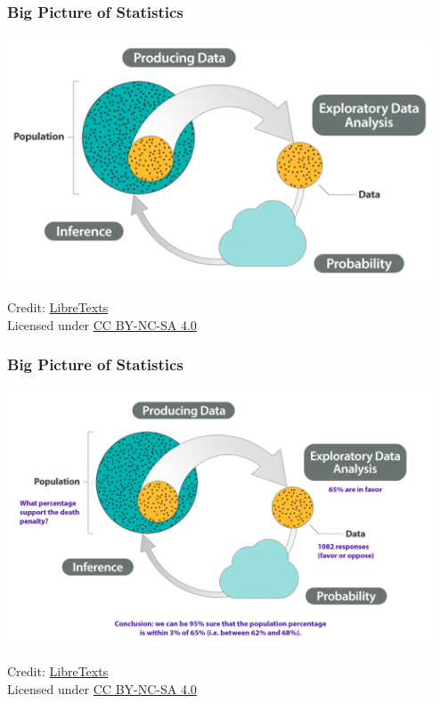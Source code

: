 \documentclass[slidestop,compress,mathserif]{beamer}
\begin{document}

\begin{frame}
    \frametitle{Big Picture of Statistics}
    \begin{center}
        \includegraphics[width=0.95\textwidth]{BigPicture1.png}
    \end{center}
    \vspace{0.5em}
    \footnotesize
    Credit: \href{https://stats.libretexts.org/Bookshelves/Applied_Statistics/Biostatistics_-_Open_Learning_Textbook/Preliminaries/The_Big_Picture}{LibreTexts}
    \\
    Licensed under \href{https://creativecommons.org/licenses/by-nc-sa/4.0/}{CC BY-NC-SA 4.0}
\end{frame}

\begin{frame}
    \frametitle{Big Picture of Statistics}
    \begin{center}
        \includegraphics[width=0.95\textwidth]{BigPicture2.png}
    \end{center}
    \vspace{0.5em}
    \footnotesize
    Credit: \href{https://stats.libretexts.org/Bookshelves/Applied_Statistics/Biostatistics_-_Open_Learning_Textbook/Preliminaries/The_Big_Picture}{LibreTexts}
    \\
    Licensed under \href{https://creativecommons.org/licenses/by-nc-sa/4.0/}{CC BY-NC-SA 4.0}
\end{frame}
\end{document}
